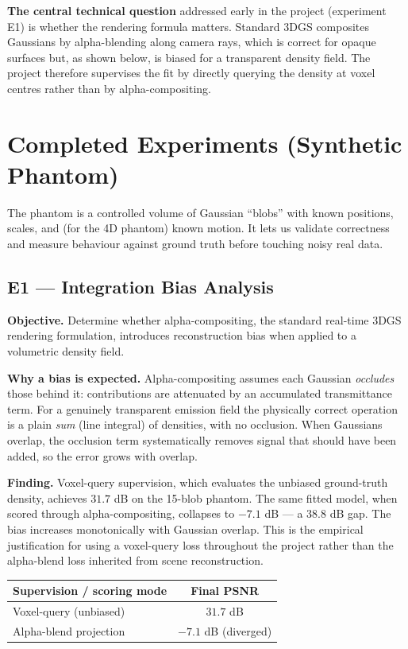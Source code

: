 \documentclass[11pt,a4paper]{article}
\begin{document}
\textbf{The central technical question} addressed early in the project (experiment E1)
is whether the rendering formula matters. Standard 3DGS composites Gaussians by
alpha-blending along camera rays, which is correct for opaque surfaces but, as shown
below, is biased for a transparent density field. The project therefore supervises the
fit by directly querying the density at voxel centres rather than by alpha-compositing.

\section{Completed Experiments (Synthetic Phantom)}

The phantom is a controlled volume of Gaussian ``blobs'' with known positions, scales,
and (for the 4D phantom) known motion. It lets us validate correctness and measure
behaviour against ground truth before touching noisy real data.

\subsection{E1 --- Integration Bias Analysis}

\textbf{Objective.}
Determine whether alpha-compositing, the standard real-time 3DGS rendering formulation,
introduces reconstruction bias when applied to a volumetric density field.

\textbf{Why a bias is expected.}
Alpha-compositing assumes each Gaussian \emph{occludes} those behind it: contributions
are attenuated by an accumulated transmittance term. For a genuinely transparent
emission field the physically correct operation is a plain \emph{sum} (line integral)
of densities, with no occlusion. When Gaussians overlap, the occlusion term
systematically removes signal that should have been added, so the error grows with
overlap.

\textbf{Finding.}
Voxel-query supervision, which evaluates the unbiased ground-truth density, achieves
\(31.7\) dB on the 15-blob phantom. The same fitted model, when scored through
alpha-compositing, collapses to \(-7.1\) dB --- a \(38.8\) dB gap. The bias increases
monotonically with Gaussian overlap. This is the empirical justification for using a
voxel-query loss throughout the project rather than the alpha-blend loss inherited from
scene reconstruction.

\begin{table}[h!]
\centering
\begin{tabular}{@{}lc@{}}
\toprule
\textbf{Supervision / scoring mode} & \textbf{Final PSNR} \\
\midrule
Voxel-query (unbiased)        & \(31.7\) dB \\
Alpha-blend projection        & \(-7.1\) dB (diverged) \\
\bottomrule
\end{tabular}
\end{table}
\end{document}
